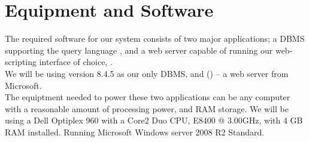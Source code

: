 \section{Equipment and Software}
\label{sec:equipmentsoftware}

The required software for our system consists of two major applications; a DBMS supporting the query language \sql[], and a web server capable of running our web-scripting interface of choice, \aspnet[].\\
We will be using \posgresql[] version 8.4.5 as our only DBMS, and  \wholeiis[] (\iis[]) -- a web server from Microsoft.\\

The equiptment needed to power these two applications can be any computer with a reasonable amount of processing power, and RAM storage. We will be using a Dell Optiplex 960 with a Core2 Duo CPU, E8400 @ 3.00GHz, with 4 GB RAM installed. Running Microsoft Windows server 2008 R2 Standard.